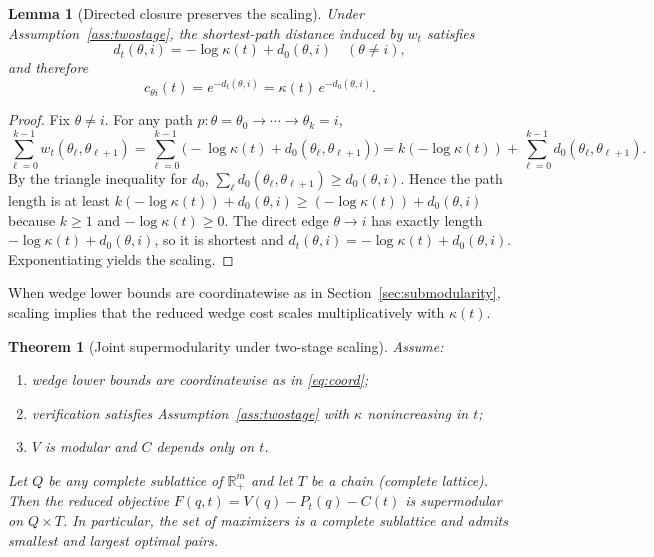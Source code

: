 \documentclass[final,3p,times]{elsarticle}
\theoremstyle{plain}
\newtheorem{theorem}{Theorem}
\newtheorem{lemma}{Lemma}
\theoremstyle{definition}
\newcommand{\R}{\mathbb{R}}
\newcommand{\1}{\mathbbm{1}}
\begin{document}
\begin{lemma}[Directed closure preserves the scaling]\label{lem:closure-scaling}
Under Assumption~\ref{ass:twostage}, the shortest-path distance induced by $w_t$ satisfies
\[
d_t(\theta,i)= -\log\kappa(t)+d_0(\theta,i)\quad (\theta\neq i),
\]
and therefore
\[
c_{\theta i}(t)=e^{-d_t(\theta,i)}=\kappa(t)\,e^{-d_0(\theta,i)}.
\]
\end{lemma}

\begin{proof}
Fix $\theta\neq i$. For any path $p:\theta=\theta_0\to\cdots\to\theta_k=i$,
\[
\sum_{\ell=0}^{k-1} w_t(\theta_\ell,\theta_{\ell+1})
= \sum_{\ell=0}^{k-1} \big(-\log\kappa(t)+d_0(\theta_\ell,\theta_{\ell+1})\big)
= k(-\log\kappa(t))+\sum_{\ell=0}^{k-1} d_0(\theta_\ell,\theta_{\ell+1}).
\]
By the triangle inequality for $d_0$, $\sum_{\ell} d_0(\theta_\ell,\theta_{\ell+1})\ge d_0(\theta,i)$. Hence the path length is at least $k(-\log\kappa(t))+d_0(\theta,i)\ge (-\log\kappa(t))+d_0(\theta,i)$ because $k\ge 1$ and $-\log\kappa(t)\ge 0$. The direct edge $\theta\to i$ has exactly length $-\log\kappa(t)+d_0(\theta,i)$, so it is shortest and $d_t(\theta,i)=-\log\kappa(t)+d_0(\theta,i)$. Exponentiating yields the scaling.
\end{proof}

When wedge lower bounds are coordinatewise as in Section~\ref{sec:submodularity}, scaling implies that the reduced wedge cost scales multiplicatively with $\kappa(t)$.

\begin{theorem}[Joint supermodularity under two-stage scaling]\label{thm:two-stage}
Assume:
\begin{enumerate}[label=(\roman*)]
\item wedge lower bounds are coordinatewise as in \eqref{eq:coord};
\item verification satisfies Assumption~\ref{ass:twostage} with $\kappa$ nonincreasing in $t$;
\item $V$ is modular and $C$ depends only on $t$.
\end{enumerate}
Let $Q$ be any complete sublattice of $\R_+^m$ and let $T$ be a chain (complete lattice). Then the reduced objective $F(q,t)=V(q)-P_t(q)-C(t)$ is supermodular on $Q\times T$. In particular, the set of maximizers is a complete sublattice and admits smallest and largest optimal pairs.
\end{theorem}
\end{document}
